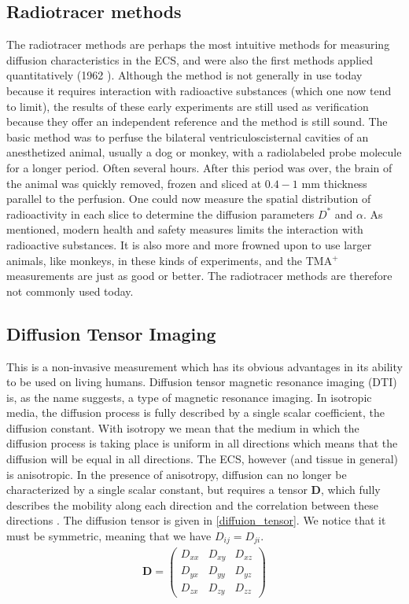 \documentclass[a4paper,english, 12pt, twoside]{article}
\begin{document}
\subsection{Radiotracer methods}
The radiotracer methods are perhaps the most intuitive methods for measuring diffusion characteristics in the ECS, and were also the first methods applied quantitatively (1962 \cite{}). 
Although the method is not generally in use today because it requires interaction with radioactive substances (which one now tend to limit), the results of these early experiments are still used as verification because they offer an independent reference and the method is still sound. 
The basic method was to perfuse the bilateral ventriculoscisternal cavities of an anesthetized animal, usually a dog or monkey, with a radiolabeled probe molecule for a longer period. Often several hours. 
After this period was over, the brain of the animal was quickly removed, frozen and sliced at $0.4-1$ mm thickness parallel to the perfusion. 
One could now measure the spatial distribution of radioactivity in each slice to determine the diffusion parameters $D^*$ and $\alpha$. 
As mentioned, modern health and safety measures limits the interaction with radioactive substances. 
It is also more and more frowned upon to use larger animals, like monkeys, in these kinds of experiments, and the TMA$^+$ measurements are just as good or better. 
The radiotracer methods are therefore not commonly used today.

\subsection{Diffusion Tensor Imaging}
This is a non-invasive measurement which has its obvious advantages in its ability to be used on living humans. 
Diffusion tensor magnetic resonance imaging (DTI) is, as the name suggests, a type of magnetic resonance imaging. 
In isotropic media, the diffusion process is fully described by a single scalar coefficient, the diffusion constant. 
With isotropy we mean that the medium in which the diffusion process is taking place is uniform in all directions which means that the diffusion will be equal in all directions. 
The ECS, however (and tissue in general) is anisotropic. 
In the presence of anisotropy, diffusion can no longer be characterized by a single scalar constant, but requires a tensor $\mathbf{D}$, which fully describes the mobility along each direction and the correlation between these directions \cite{le2001diffusion}. 
The diffusion tensor is given in \ref{diffuion_tensor}. We notice that it must be symmetric, meaning that we have $D_{ij} = D_{ji}$.
\begin{align}\label{diffuion_tensor}
 \mathbf{D} = \left(\begin{array}{ccc}
                     D_{xx} & D_{xy} & D_{xz}\\
                     D_{yx} & D_{yy} & D_{yz}\\
                     D_{zx} & D_{zy} & D_{zz}
                    \end{array}\right)
\end{align}
\end{document}

